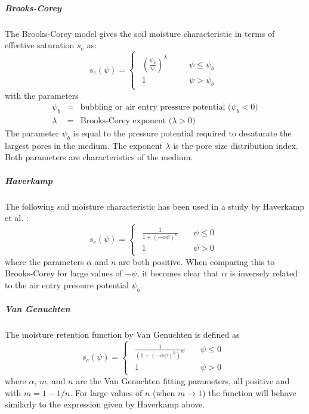 \documentclass[fleqn]{article}
\begin{document}
\subparagraph{Brooks-Corey}
The Brooks-Corey model \cite{brookscorey1966} gives the soil
moisture characteristic in terms of effective saturation $s_e$ as:
\begin{equation}
  s_e(\psi)  =
  \begin{cases}
    \begin{aligned}
      \left( \frac{\psi_b}{\psi} \right)^{\lambda} & \quad & \psi \leq \psi_b \\
      1                                            & \quad & \psi > \psi_b
    \end{aligned}
  \end{cases}
  \label{eq-seff-BrooksCorey}
\end{equation}
with the parameters
\begin{eqnarray*}
  \psi_b  &=& \text{bubbling or air entry pressure potential ($\psi_b < 0$)}\\
  \lambda &=& \text{Brooks-Corey exponent ($\lambda>0$)}
\end{eqnarray*}
The parameter $\psi_b$ is equal to the pressure potential required 
to desaturate the largest pores in the medium. The exponent $\lambda$
is the pore size distribution index. Both parameters are characteristics
of the medium.

\subparagraph{Haverkamp}
The following soil moisture characteristic has been used in a study by
Haverkamp et al. \cite{haverkampetal-1977}:
\begin{equation}
  s_e(\psi)  =
  \begin{cases}
    \begin{aligned}
      \frac{1}
      {
        1 + \left( -\alpha\psi \right)^{n}
      } \quad & \psi \leq 0 \\
      1 \quad & \psi > 0
    \end{aligned}
  \end{cases}
  \label{eq-seff-Haverkamp}
\end{equation}
where the parameters $\alpha$ and $n$ are both positive. 
When comparing this to Brooks-Corey for large values of $-\psi$,
it becomes clear that $\alpha$ is inversely related to the air entry 
pressure potential $\psi_b$.

\subparagraph{Van Genuchten}
The moisture retention function by Van Genuchten \cite{vangenuchten-1980}
is defined as
\begin{equation}
  s_e(\psi) =
  \begin{cases}
    \begin{aligned}
      \frac{1}
      {
        \left( 1 + \left( -\alpha\psi \right)^{n}
        \right)^{m}
      } \quad & \psi \leq 0 \\
      1 \quad & \psi > 0
    \end{aligned}
  \end{cases}
  \label{eq-seff-vanGenuchten}
\end{equation}
where $\alpha$, $m$, and $n$ are the Van Genuchten fitting parameters, 
all positive and with $m = 1 - 1/n$. For large
values of $n$ (when $m \rightarrow 1$) the function will behave similarly
to the expression given by Haverkamp above.
\end{document}

